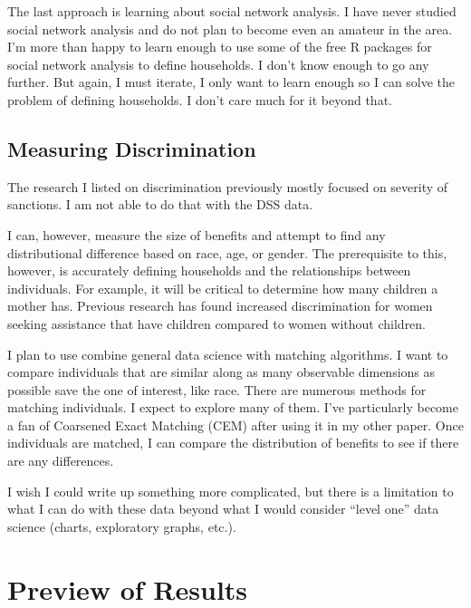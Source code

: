 \documentclass[12pt,letterpaperpaper,]{book}
\begin{document}
The last approach is learning about social network analysis. I have
never studied social network analysis and do not plan to become even an
amateur in the area. I'm more than happy to learn enough to use some of
the free R packages for social network analysis to define households. I
don't know enough to go any further. But again, I must iterate, I only
want to learn enough so I can solve the problem of defining households.
I don't care much for it beyond that.

\subsection*{Measuring Discrimination}\label{measuring-discrimination}

The research I listed on discrimination previously mostly focused on
severity of sanctions. I am not able to do that with the DSS data.

I can, however, measure the size of benefits and attempt to find any
distributional difference based on race, age, or gender. The
prerequisite to this, however, is accurately defining households and the
relationships between individuals. For example, it will be critical to
determine how many children a mother has. Previous research has found
increased discrimination for women seeking assistance that have children
compared to women without children.

I plan to use combine general data science with matching algorithms. I
want to compare individuals that are similar along as many observable
dimensions as possible save the one of interest, like race. There are
numerous methods for matching individuals. I expect to explore many of
them. I've particularly become a fan of Coarsened Exact Matching (CEM)
after using it in my other paper. Once individuals are matched, I can
compare the distribution of benefits to see if there are any
differences.

I wish I could write up something more complicated, but there is a
limitation to what I can do with these data beyond what I would consider
``level one'' data science (charts, exploratory graphs, etc.).

\hypertarget{preview-2}{\section*{Preview of Results}\label{preview-2}}
\end{document}
